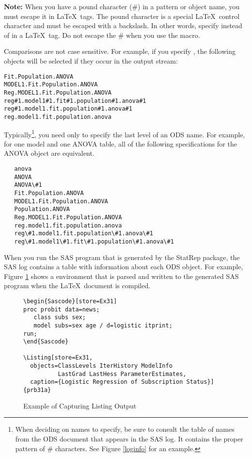 \documentclass[article,oneside]{memoir}
\newcommand*{\StatRep}{\textsf{StatRep}\xspace}
\begin{document}
  \textbf{Note:} When you have a pound character (\#) in a pattern or object name,
  you must escape it in \LaTeX\ tags. The pound character is a special \LaTeX\ control
  character and must be escaped with a backslash.
  In other words, specify  instead of
   in a \LaTeX\ tag.
  Do not escape the \# when you use the  macro.

  Comparisons are not case sensitive. For example, if you specify ,
  the following objects will be selected if they occur in the output stream:
\begin{snugshade}
\begin{verbatim}
Fit.Population.ANOVA
MODEL1.Fit.Population.ANOVA
Reg.MODEL1.Fit.Population.ANOVA
reg#1.model1#1.fit#1.population#1.anova#1
reg#1.model1.fit.population#1.anova#1
reg.model1.fit.population.anova
\end{verbatim}
\end{snugshade}

  Typically\footnote{When deciding on names to specify, be sure to consult the table of names
  from the ODS document that appears in the SAS log. It contains the proper pattern
  of \# characters. See Figure \ref{loginfo} for an example.},
  you need only to specify the last level of an ODS name.
  For example, for one model and one ANOVA table,
  all of the following specifications for the ANOVA object are equivalent.

\begin{snugshade}
\begin{verbatim}
   anova
   ANOVA
   ANOVA\#1
   Fit.Population.ANOVA
   MODEL1.Fit.Population.ANOVA
   Population.ANOVA
   Reg.MODEL1.Fit.Population.ANOVA
   reg.model1.fit.population.anova
   reg\#1.model1.fit.population\#1.anova\#1
   reg\#1.model1\#1.fit\#1.population\#1.anova\#1
\end{verbatim}
\end{snugshade}

  When you run the SAS program that is generated by the \StatRep package,
  the SAS log contains a table with information about each ODS object.
  For example, Figure \ref{capturelist} shows a  environment that
  is parsed and written to the generated SAS program when the \LaTeX\ document
  is compiled.
\begin{figure}[H]
\begin{snugshade}
\begin{verbatim}
\begin{Sascode}[store=Ex31]
proc probit data=news;
   class subs sex;
   model subs=sex age / d=logistic itprint;
run;
\end{Sascode}

\Listing[store=Ex31,
  objects=ClassLevels IterHistory ModelInfo
          LastGrad LastHess ParameterEstimates,
  caption={Logistic Regression of Subscription Status}]{prb31a}

\end{verbatim}
\end{snugshade}
\caption{Example of Capturing Listing Output}\label{capturelist}
\end{figure}
\end{document}
